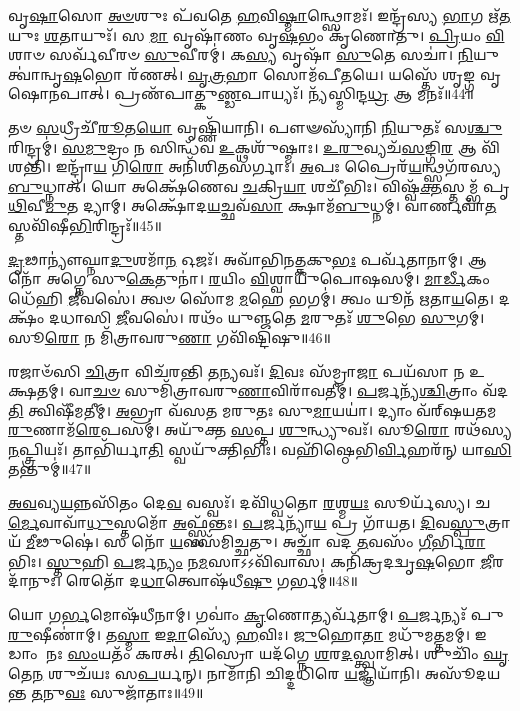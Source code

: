 𑌵𑍃\-\ul{𑌷𑌾}\-𑌸𑍋 \ul{𑌅}\-\-\ul{𑍞}\-𑌶𑍁𑌃 𑌪᳴𑌵𑌤𑍇 \ul{𑌹}\-𑌵𑌿\-\ul{𑌷𑍍𑌮𑌾}\-𑌨𑍍𑌥𑍍𑌸𑍋𑌮𑌃᳴।
𑌇𑌨𑍍𑌦𑍍𑌰᳴𑌸𑍍𑌯 \ul{𑌭𑌾}\-𑌗 𑌋᳴\-\ul{𑌤}\-𑌯𑍁𑌃 \ul{𑌶}\-𑌤𑌾𑌯𑍁𑌃᳴।
𑌸 \ul{𑌮𑌾} 𑌵𑍃𑌷𑌾᳴𑌣𑌂 𑌵𑍃\-\ul{𑌷}\-𑌭𑌂 𑌕𑍃᳴𑌣𑍋𑌤𑍁।
\-\ul{𑌪𑍍𑌰𑌿}\-𑌯𑌂 \ul{𑌵𑌿}\-𑌶𑌾𑍞 𑌸𑌰𑍍𑌵᳴𑌵𑍀𑌰𑍞 \ul{𑌸𑍁}\-𑌵𑍀𑌰𑌮𑍍॑।
𑌕\-\ul{𑌸𑍍𑌯} 𑌵𑍃𑌷𑌾᳴ \ul{𑌸𑍁}\-𑌤𑍇 𑌸𑌚𑌾॑।
\-\ul{𑌨𑌿}\-𑌯𑍁𑌤𑍍𑌵𑌾॑𑌨𑍍𑌵𑍃\-\ul{𑌷}\-𑌭𑍋 𑌰᳴𑌣𑌤𑍍।
\-\ul{𑌵𑍃}\-\-\ul{𑌤𑍍𑌰}\-𑌹𑌾 𑌸𑍋𑌮᳴𑌪𑍀𑌤𑌯𑍇।
𑌯𑌸𑍍𑌤𑍇᳴ 𑌶𑍃𑌙𑍍𑌗 𑌵𑍃𑌷𑍋𑌨𑌪𑌾𑌤𑍍।
𑌪𑍍𑌰𑌣᳴𑌪𑌾𑌤𑍍𑌕𑍁\-\ul{𑌣𑍍𑌡}\-𑌪𑌾𑌯𑍍𑌯𑌃᳴।
𑌨𑍍𑌯᳴𑌸𑍍𑌮𑌿𑌨𑍍𑌦\-\ul{𑌧𑍍𑌰} 𑌆 𑌮𑌨𑌃᳴॥44॥

𑌤𑍞 \ul{𑌸}\-𑌧𑍍𑌰𑍀𑌚𑍀᳴\-\ul{𑌰𑍂}\-𑌤\-\ul{𑌯𑍋} 𑌵𑍃𑌷𑍍𑌣𑌿᳴𑌯𑌾𑌨𑌿।
𑌪𑍗𑍟𑌸𑍍𑌯𑌾᳴𑌨𑌿 \ul{𑌨𑌿}\-𑌯𑍁𑌤𑌃᳴ 𑌸\-\ul{𑌶𑍍𑌚𑍁}\-\-𑌰𑌿𑌨𑍍𑌦𑍍𑌰𑌮𑍍॑।
\-\ul{𑌸}\-\-\ul{𑌮𑍁}\-𑌦𑍍𑌰𑌂 𑌨 𑌸𑌿𑌨𑍍𑌧᳴𑌵 \ul{𑌉}\-𑌕𑍍𑌥𑌶𑍁᳴𑌷𑍍𑌮𑌾𑌃।
\-\ul{𑌉}\-\-\ul{𑌰𑍁}\-𑌵𑍍𑌯𑌚᳴\-\ul{𑌸}\-𑌙𑍍𑌗𑌿\-\ul{𑌰} 𑌆 𑌵𑌿᳴𑌶𑌨𑍍𑌤𑌿।
𑌇𑌨𑍍𑌦𑍍𑌰𑌾᳴\-\ul{𑌯} 𑌗𑌿\-\ul{𑌰𑍋} 𑌅𑌨𑌿᳴𑌶𑌿𑌤𑌸𑌰𑍍𑌗𑌾𑌃।
\-\ul{𑌅}\-𑌪𑌃 𑌪𑍍𑌰𑍈𑌰᳴\-\ul{𑌯}\-𑌨𑍍𑌥𑍍𑌸𑌗᳴𑌰𑌸𑍍𑌯 \ul{𑌬𑍁}\-𑌧𑍍𑌨𑌾𑌤𑍍।
𑌯𑍋 𑌅𑌕𑍍𑌷𑍇᳴𑌣𑍇𑌵 \ul{𑌚}\-𑌕𑍍𑌰𑌿\-\ul{𑌯𑌾} 𑌶𑌚𑍀᳴𑌭𑌿𑌃।
𑌵𑌿𑌷𑍍𑌵᳴\-\ul{𑌕𑍍𑌤}\-𑌸𑍍𑌤𑌮𑍍𑌭᳴ 𑌪𑍃\-\ul{𑌥𑌿}\-𑌵𑍀\-\ul{𑌮𑍁}\-𑌤 𑌦𑍍𑌯𑌾𑌮𑍍।
𑌅𑌕𑍍𑌷𑍋᳴𑌦\-\ul{𑌯}\-𑌚𑍍𑌛𑌵᳴\-\ul{𑌸𑌾} 𑌕𑍍𑌷𑌾𑌮᳴\-\ul{𑌬𑍁}\-𑌧𑍍𑌨𑌮𑍍।
𑌵𑌾𑌰𑍍𑌣𑌵𑌾᳴\-\ul{𑌤}\-𑌸𑍍𑌤𑌵𑌿᳴𑌷𑍀\-\ul{𑌭𑌿}\-𑌰𑌿𑌨𑍍𑌦𑍍𑌰𑌃᳴॥45॥

\-\ul{𑌦𑍃}\-𑌢𑌾𑌨𑍍𑌯𑍗॑𑌘𑍍𑌨𑌾\-\ul{𑌦𑍁}\-𑌶𑌮𑌾᳴\-\ul{𑌨} 𑌓𑌜𑌃᳴।
𑌅𑌵𑌾᳴𑌭𑌿𑌨\-\ul{𑌤𑍍𑌕}\-𑌕𑍁\-\ul{𑌭𑌃} 𑌪𑌰𑍍𑌵᳴𑌤𑌾𑌨𑌾𑌮𑍍।
𑌆 𑌨𑍋᳴ 𑌅𑌗𑍍𑌨𑍇 𑌸𑍁\-\ul{𑌕𑍇}\-𑌤𑍁𑌨𑌾॑।
\-\ul{𑌰}\-𑌯𑌿𑌂 \ul{𑌵𑌿}\-𑌶𑍍𑌵𑌾𑌯𑍁᳴𑌪𑍋𑌷𑌸𑌮𑍍।
\-\ul{𑌮𑌾}\-\-\ul{𑌰𑍍𑌡𑍀}\-𑌕𑌂 𑌧𑍇᳴𑌹𑌿 \ul{𑌜𑍀}\-𑌵𑌸𑍇॑।
𑌤𑍍𑌵𑍞 𑌸𑍋᳴𑌮 \ul{𑌮}\-𑌹𑍇 𑌭𑌗𑌮𑍍॑।
𑌤𑍍𑌵𑌂 𑌯𑍂𑌨᳴ 𑌋𑌤𑌾\-\ul{𑌯}\-𑌤𑍇।
𑌦𑌕𑍍𑌷𑌂᳴ 𑌦𑌧𑌾𑌸𑌿 \ul{𑌜𑍀}\-𑌵𑌸𑍇॑।
𑌰𑌥𑌂᳴ 𑌯𑍁𑌞𑍍𑌜𑌤𑍇 \ul{𑌮}\-𑌰𑍁𑌤𑌃᳴ \ul{𑌶𑍁}\-𑌭𑍇 \ul{𑌸𑍁}\-𑌗𑌮𑍍।
𑌸𑍂\-\ul{𑌰𑍋} 𑌨 𑌮𑌿᳴𑌤𑍍𑌰𑌾𑌵𑌰𑍁\-\ul{𑌣𑌾} 𑌗𑌵𑌿᳴𑌷𑍍𑌟𑌿𑌷𑍁॥46॥

𑌰𑌜𑌾𑍞᳴𑌸𑌿 \ul{𑌚𑌿}\-𑌤𑍍𑌰𑌾 𑌵𑌿𑌚᳴𑌰𑌨𑍍𑌤𑌿 \ul{𑌤}\-𑌨𑍍𑌯𑌵𑌃᳴।
\-\ul{𑌦𑌿}\-𑌵𑌃 𑌸᳴𑌮𑍍𑌰𑌾\-\ul{𑌜𑌾} 𑌪𑌯᳴𑌸𑌾 𑌨 𑌉𑌕𑍍𑌷𑌤𑌮𑍍।
𑌵𑌾\-\ul{𑌚}\-\-\ul{𑍞} 𑌸𑍁𑌮𑌿᳴𑌤𑍍𑌰𑌾𑌵𑌰𑍁\-\ul{𑌣𑌾}\-𑌵𑌿𑌰𑌾᳴𑌵𑌤𑍀𑌮𑍍।
\-\ul{𑌪}\-𑌰𑍍𑌜𑌨𑍍𑌯᳴\-\ul{𑌶𑍍𑌚𑌿}\-𑌤𑍍𑌰𑌾𑌂 𑌵᳴𑌦\-\ul{𑌤𑌿} 𑌤𑍍𑌵𑌿𑌷𑍀᳴𑌮𑌤𑍀𑌮𑍍।
\-\ul{𑌅}\-𑌭𑍍𑌰𑌾 𑌵᳴𑌸𑌤 𑌮𑌰𑍁𑌤𑌃 𑌸𑍁\-\ul{𑌮𑌾}\-𑌯𑌯𑌾॑।
𑌦𑍍𑌯𑌾𑌂 𑌵᳴𑌰𑍍‌\mbox{}𑌷𑌯𑌤𑌮\-\ul{𑌰𑍁}\-𑌣𑌾𑌮᳴\-\ul{𑌰𑍇}\-𑌪𑌸𑌮𑍍॑।
𑌅𑌯𑍁᳴𑌕𑍍𑌤 \ul{𑌸}\-𑌪𑍍𑌤 \ul{𑌶𑍁}\-𑌨𑍍𑌧𑍍𑌯𑍁𑌵𑌃᳴।
𑌸𑍂\-\ul{𑌰𑍋} 𑌰𑌥᳴𑌸𑍍𑌯 \ul{𑌨}\-𑌪𑍍𑌤𑍍𑌰𑌿𑌯𑌃᳴।
𑌤𑌾𑌭𑌿᳴𑌰𑍍𑌯𑌾\-\ul{𑌤𑌿} 𑌸𑍍𑌵𑌯𑍁᳴𑌕𑍍𑌤𑌿𑌭𑌿𑌃।
𑌵𑌹𑌿᳴𑌷𑍍𑌠𑍇𑌭𑌿\-\ul{𑌰𑍍𑌵𑌿}\-𑌹𑌰᳴𑌨𑍍 𑌯𑌾\-\ul{𑌸𑌿} 𑌤𑌨𑍍𑌤𑍁𑌮𑍍॑॥47॥

\-\ul{𑌅}\-\-\ul{𑌵}\-𑌵𑍍𑌯\-\ul{𑌯}\-𑌨𑍍𑌨𑌸𑌿᳴𑌤𑌂 𑌦𑍇\-\ul{𑌵} 𑌵𑌸𑍍𑌵𑌃᳴।
𑌦𑌵𑌿᳴𑌧𑍍𑌵𑌤𑍋 \ul{𑌰}\-𑌶𑍍𑌮\-\ul{𑌯𑌃} 𑌸𑍂𑌰𑍍𑌯᳴𑌸𑍍𑌯।
𑌚\-\ul{𑌰𑍍𑌮𑍇}\-𑌵𑌾𑌵𑌾᳴\-\ul{𑌧𑍁}\-𑌸𑍍𑌤𑌮𑍋᳴ \ul{𑌅}\-𑌫𑍍𑌸𑍍𑌵᳴𑌨𑍍𑌤𑌃।
\-\ul{𑌪}\-𑌰𑍍𑌜𑌨𑍍𑌯𑌾᳴\-\ul{𑌯} 𑌪𑍍𑌰 𑌗𑌾᳴𑌯𑌤।
\-\ul{𑌦𑌿}\-𑌵\-\ul{𑌸𑍍𑌪𑍁}\-𑌤𑍍𑌰𑌾𑌯᳴ \ul{𑌮𑍀}\-𑌢𑍁𑌷𑍇॑।
𑌸 𑌨𑍋᳴ \ul{𑌯}\-𑌵𑌸᳴𑌮𑌿𑌚𑍍𑌛𑌤𑍁।
𑌅𑌚𑍍𑌛𑌾᳴ 𑌵𑌦 \ul{𑌤}\-𑌵𑌸𑌂᳴ \ul{𑌗𑍀}\-𑌰𑍍𑌭𑌿\-\ul{𑌰𑌾}\-𑌭𑌿𑌃।
\-\ul{𑌸𑍍𑌤𑍁}\-𑌹𑌿 \ul{𑌪}\-𑌰𑍍𑌜\-\ul{𑌨𑍍𑌯𑌂} 𑌨\-\ul{𑌮}\-𑌸𑌾\-𑌽𑌽𑌵𑌿᳴𑌵𑌾𑌸।
𑌕𑌨𑌿᳴𑌕𑍍𑌰𑌦𑌦𑍍𑌵𑍃\-\ul{𑌷}\-𑌭𑍋 \ul{𑌜𑍀}\-𑌰𑌦𑌾᳴𑌨𑍁𑌃।
𑌰𑍇𑌤𑍋᳴ 𑌦\-\ul{𑌧𑌾}\-𑌤𑍍𑌵𑍋𑌷᳴𑌧𑍀\-\ul{𑌷𑍁} 𑌗𑌰𑍍𑌭𑌮𑍍॑॥48॥

𑌯𑍋 𑌗\-\ul{𑌰𑍍𑌭}\-𑌮𑍋𑌷᳴𑌧𑍀𑌨𑌾𑌮𑍍।
𑌗𑌵𑌾𑌂॑ \ul{𑌕𑍃}\-𑌣𑍋𑌤𑍍𑌯𑌰𑍍𑌵᳴𑌤𑌾𑌮𑍍।
\-\ul{𑌪}\-𑌰𑍍𑌜𑌨𑍍𑌯𑌃᳴ 𑌪𑍁\-\ul{𑌰𑍁}\-𑌷𑍀𑌣𑌾॑𑌮𑍍।
𑌤\-\ul{𑌸𑍍𑌮𑌾} 𑌇\-\ul{𑌦𑌾}\-𑌸𑍍𑌯𑍇᳴ \ul{𑌹}\-𑌵𑌿𑌃।
\-\ul{𑌜𑍁}\-𑌹𑍋\-\ul{𑌤𑌾} 𑌮𑌧𑍁᳴𑌮𑌤𑍍𑌤𑌮𑌮𑍍।
𑌇𑌡𑌾𑌂 𑌨𑌃 \ul{𑌸𑌂}\-𑌯𑌤𑌂᳴ 𑌕𑌰𑌤𑍍।
\-\ul{𑌤𑌿}\-𑌸𑍍𑌰𑍋 𑌯𑌦᳴𑌗𑍍𑌨𑍇 \ul{𑌶}\-𑌰\-\ul{𑌦}\-𑌸𑍍𑌤𑍍𑌵𑌾𑌮𑌿𑌤𑍍।
𑌶𑍁𑌚𑌿𑌂᳴ \ul{𑌘𑍃}\-𑌤𑍇\-\ul{𑌨} 𑌶𑍁𑌚᳴𑌯𑌃 𑌸\-\ul{𑌪}\-𑌰𑍍𑌯𑌨𑍍।
𑌨𑌾𑌮𑌾᳴𑌨𑌿 𑌚𑌿𑌦𑍍𑌦𑌧𑌿𑌰𑍇 \ul{𑌯}\-𑌜𑍍𑌞𑌿𑌯𑌾᳴𑌨𑌿।
𑌅𑌸𑍂᳴𑌦𑌯𑌨𑍍𑌤 \ul{𑌤}\-𑌨𑍁\-\ul{𑌵𑌃} 𑌸𑍁𑌜𑌾᳴𑌤𑌾𑌃॥49॥

